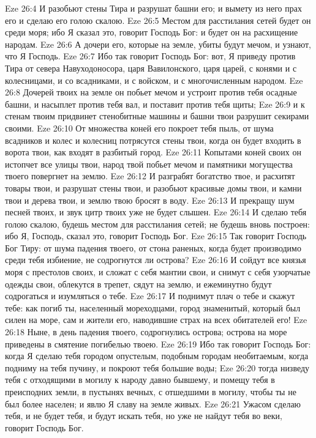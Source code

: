 \vs Eze 26:4 И разобьют стены Тира и разрушат башни его; и вымету из него прах его и сделаю его голою скалою.
\vs Eze 26:5 Местом для расстилания сетей будет он среди моря; ибо Я сказал это, говорит Господь Бог: и будет он на расхищение народам.
\vs Eze 26:6 А дочери его, которые на земле, убиты будут мечом, и узнают, что Я Господь.
\vs Eze 26:7 Ибо так говорит Господь Бог: вот, Я приведу против Тира от севера Навуходоносора, царя Вавилонского, царя царей, с конями и с колесницами, и со всадниками, и с войском, и с многочисленным народом.
\vs Eze 26:8 Дочерей твоих на земле он побьет мечом и устроит против тебя осадные башни, и насыплет против тебя вал, и поставит против тебя щиты;
\vs Eze 26:9 и к стенам твоим придвинет стенобитные машины и башни твои разрушит секирами своими.
\vs Eze 26:10 От множества коней его покроет тебя пыль, от шума всадников и колес и колесниц потрясутся стены твои, когда он будет входить в ворота твои, как входят в разбитый город.
\vs Eze 26:11 Копытами коней своих он истопчет все улицы твои, народ твой побьет мечом и памятники могущества твоего повергнет на землю.
\vs Eze 26:12 И разграбят богатство твое, и расхитят товары твои, и разрушат стены твои, и разобьют красивые домы твои, и камни твои и дерева твои, и землю твою бросят в воду.
\vs Eze 26:13 И прекращу шум песней твоих, и звук цитр твоих уже не будет слышен.
\vs Eze 26:14 И сделаю тебя голою скалою, будешь местом для расстилания сетей; не будешь вновь построен: ибо Я, Господь, сказал это, говорит Господь Бог.
\vs Eze 26:15 Так говорит Господь Бог Тиру: от шума падения твоего, от стона раненых, когда будет производимо среди тебя избиение, не содрогнутся ли острова?
\vs Eze 26:16 И сойдут все князья моря с престолов своих, и сложат с себя мантии свои, и снимут с себя узорчатые одежды свои, облекутся в трепет, сядут на землю, и ежеминутно будут содрогаться и изумляться о тебе.
\vs Eze 26:17 И поднимут плач о тебе и скажут тебе: как погиб ты, населенный мореходцами, город знаменитый, который был силен на море, сам и жители его, наводившие страх на всех обитателей его!
\vs Eze 26:18 Ныне, в день падения твоего, содрогнулись острова; острова на море приведены в смятение погибелью твоею.
\vs Eze 26:19 Ибо так говорит Господь Бог: когда Я сделаю тебя городом опустелым, подобным городам необитаемым, когда подниму на тебя пучину, и покроют тебя большие воды;
\vs Eze 26:20 тогда низведу тебя с отходящими в могилу к народу давно бывшему, и помещу тебя в преисподних земли, в пустынях вечных, с отшедшими в могилу, чтобы ты не был более населен; и явлю Я славу на земле живых.
\vs Eze 26:21 Ужасом сделаю тебя, и не будет тебя, и будут искать тебя, но уже не найдут тебя во веки, говорит Господь Бог.
